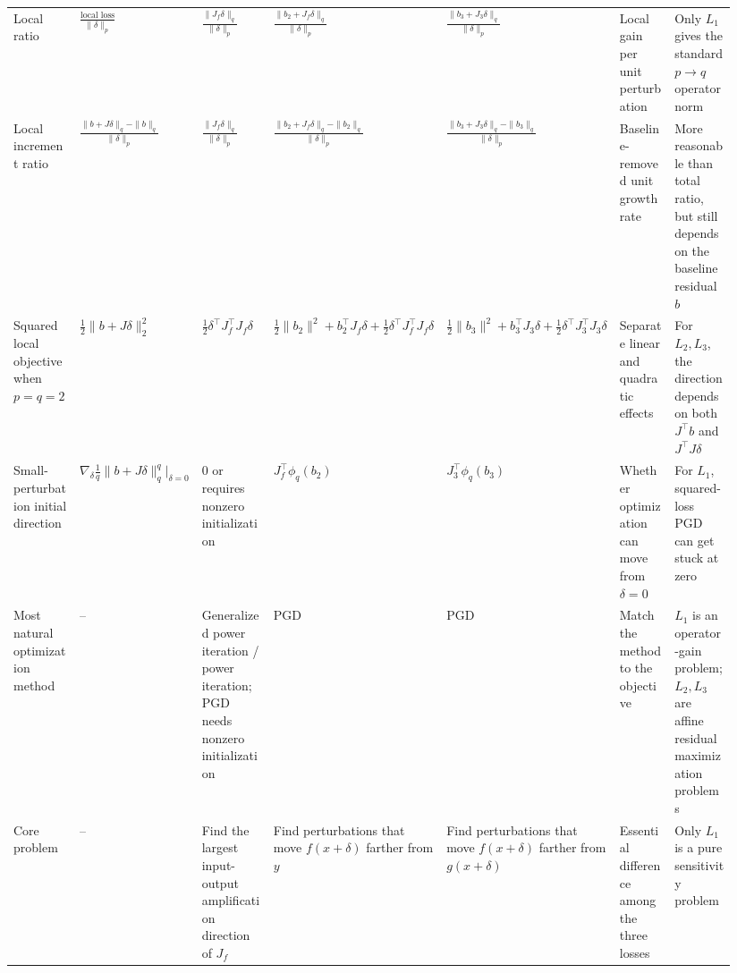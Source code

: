 \documentclass{article}
\begin{document}
\begin{landscape}
\begin{longtable}{@{}
p{0.105\linewidth}
p{0.150\linewidth}
p{0.135\linewidth}
p{0.135\linewidth}
p{0.135\linewidth}
p{0.130\linewidth}
p{0.150\linewidth}
@{}}
Local ratio
&
$\displaystyle \frac{\text{local loss}}{\|\delta\|_p}$
&
$\displaystyle \frac{\|J_f\delta\|_q}{\|\delta\|_p}$
&
$\displaystyle \frac{\|b_2+J_f\delta\|_q}{\|\delta\|_p}$
&
$\displaystyle \frac{\|b_3+J_3\delta\|_q}{\|\delta\|_p}$
&
Local gain per unit perturbation
&
Only $L_1$ gives the standard $p\to q$ operator norm
\\

Local increment ratio
&
$\displaystyle \frac{\|b+J\delta\|_q-\|b\|_q}{\|\delta\|_p}$
&
$\displaystyle \frac{\|J_f\delta\|_q}{\|\delta\|_p}$
&
$\displaystyle \frac{\|b_2+J_f\delta\|_q-\|b_2\|_q}{\|\delta\|_p}$
&
$\displaystyle \frac{\|b_3+J_3\delta\|_q-\|b_3\|_q}{\|\delta\|_p}$
&
Baseline-removed unit growth rate
&
More reasonable than total ratio, but still depends on the baseline residual $b$
\\

Squared local objective when $p=q=2$
&
$\displaystyle \frac12\|b+J\delta\|_2^2$
&
$\displaystyle \frac12\delta^\top J_f^\top J_f\delta$
&
$\displaystyle \frac12\|b_2\|^2+b_2^\top J_f\delta+\frac12\delta^\top J_f^\top J_f\delta$
&
$\displaystyle \frac12\|b_3\|^2+b_3^\top J_3\delta+\frac12\delta^\top J_3^\top J_3\delta$
&
Separate linear and quadratic effects
&
For $L_2,L_3$, the direction depends on both $J^\top b$ and $J^\top J\delta$
\\

Small-perturbation initial direction
&
$\displaystyle \nabla_\delta \frac1q\|b+J\delta\|_q^q\bigg|_{\delta=0}$
&
$0$ or requires nonzero initialization
&
$J_f^\top \phi_q(b_2)$
&
$J_3^\top \phi_q(b_3)$
&
Whether optimization can move from $\delta=0$
&
For $L_1$, squared-loss PGD can get stuck at zero
\\

Most natural optimization method
&
--
&
Generalized power iteration / power iteration; PGD needs nonzero initialization
&
PGD
&
PGD
&
Match the method to the objective
&
$L_1$ is an operator-gain problem; $L_2,L_3$ are affine residual maximization problems
\\

Core problem
&
--
&
Find the largest input-output amplification direction of $J_f$
&
Find perturbations that move $f(x+\delta)$ farther from $y$
&
Find perturbations that move $f(x+\delta)$ farther from $g(x+\delta)$
&
Essential difference among the three losses
&
Only $L_1$ is a pure sensitivity problem
\\

\end{longtable}

\end{landscape}
\end{document}
